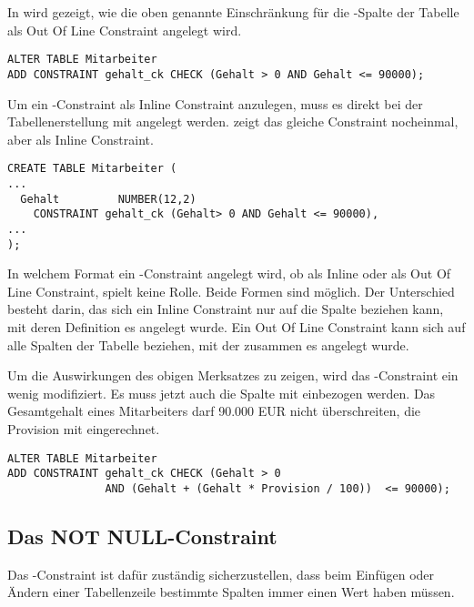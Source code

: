         In  wird gezeigt, wie die oben genannte
        Einschränkung für die -Spalte der Tabelle
         als Out Of Line Constraint angelegt wird.
        \begin{lstlisting}[language=oracle_sql,caption={Ein \CHECK-Constraint als Out Of Line Constraint},label=sql09_02]
ALTER TABLE Mitarbeiter
ADD CONSTRAINT gehalt_ck CHECK (Gehalt > 0 AND Gehalt <= 90000);
        \end{lstlisting}
        Um ein \CHECK-Constraint als Inline Constraint anzulegen, muss es direkt bei der Tabellenerstellung mit angelegt werden.  zeigt das gleiche Constraint nocheinmal, aber als Inline Constraint.
        \begin{lstlisting}[language=oracle_sql,caption={Ein \CHECK-Constraint als Inline Constraint},label=sql09_03]
CREATE TABLE Mitarbeiter (
...
  Gehalt         NUMBER(12,2)
    CONSTRAINT gehalt_ck (Gehalt> 0 AND Gehalt <= 90000),
...
);
        \end{lstlisting}
        \begin{merke}
          In welchem Format ein \CHECK-Constraint angelegt wird, ob als Inline oder als Out Of Line Constraint, spielt keine Rolle. Beide Formen sind möglich. Der Unterschied besteht darin, das sich ein Inline Constraint nur auf die Spalte beziehen kann, mit deren Definition es angelegt wurde. Ein Out Of Line Constraint kann sich auf alle Spalten der Tabelle beziehen, mit der zusammen es angelegt wurde.
        \end{merke}
        Um die Auswirkungen des obigen Merksatzes zu zeigen, wird das -Constraint ein wenig modifiziert. Es muss jetzt auch die Spalte  mit einbezogen werden. Das Gesamtgehalt eines Mitarbeiters darf 90.000 EUR nicht überschreiten, die Provision mit eingerechnet.
        \begin{lstlisting}[language=oracle_sql,caption={Ein komplexes \CHECK-Constraint},label=sql09_04]
ALTER TABLE Mitarbeiter
ADD CONSTRAINT gehalt_ck CHECK (Gehalt > 0
               AND (Gehalt + (Gehalt * Provision / 100))  <= 90000);
        \end{lstlisting}
      \subsection{Das NOT NULL-Constraint}
        Das \NOTNULL-Constraint ist dafür zuständig sicherzustellen, dass beim Einfügen oder Ändern einer Tabellenzeile bestimmte Spalten immer einen Wert haben müssen.

